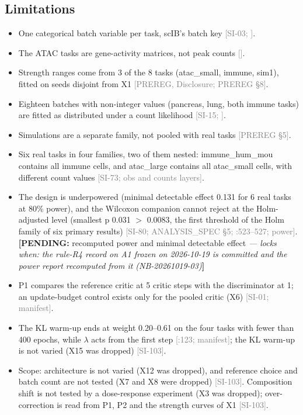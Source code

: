 \documentclass[11pt]{article}
\newcommand{\src}[1]{{\scriptsize\textcolor{gray}{[#1]}}}
\newcommand{\pending}[2]{{\color{BurntOrange}\textbf{[PENDING:} #1 \textit{--- locks when: #2}\textbf{]}}}
\begin{document}
\subsection{Limitations}
\begin{itemize}
\item One categorical batch variable per task, scIB's batch key \src{SI-03; }.
\item The ATAC tasks are gene-activity matrices, not peak counts \src{}.
\item Strength ranges come from 3 of the 8 tasks (atac\_small, immune, sim1), fitted on seeds disjoint from X1 \src{PREREG, Disclosure; PREREG \S8}.
\item Eighteen batches with non-integer values (pancreas, lung, both immune tasks) are fitted as distributed under a count likelihood \src{SI-15; }.
\item Simulations are a separate family, not pooled with real tasks \src{PREREG \S5}.
\item Six real tasks in four families, two of them nested: immune\_hum\_mou contains all immune cells, and atac\_large contains all atac\_small cells, with different count values \src{SI-73;  obs and counts layers}.
\item The design is underpowered (minimal detectable effect 0.131 for 6 real tasks at 80\% power), and the Wilcoxon companion cannot reject at the Holm-adjusted level (smallest p 0.031 $>$ 0.0083, the first threshold of the Holm family of six primary results) \src{SI-80; ANALYSIS\_SPEC \S5; :523--527; \file{docs/prereg/r1_record.json} power}. \pending{recomputed power and minimal detectable effect}{the rule-R4 record on A1 frozen on 2026-10-19 is committed and the power report recomputed from it (NB-20261019-03)}
\item P1 compares the reference critic at 5 critic steps with the discriminator at 1; an update-budget control exists only for the pooled critic (X6) \src{SI-01; manifest}.
\item The KL warm-up ends at weight 0.20--0.61 on the four tasks with fewer than 400 epochs, while $\lambda$ acts from the first step \src{:123; manifest}; the KL warm-up is not varied (X15 was dropped) \src{SI-103}.
\item Scope: architecture is not varied (X12 was dropped), and reference choice and batch count are not tested (X7 and X8 were dropped) \src{SI-103}. Composition shift is not tested by a dose-response experiment (X3 was dropped); over-correction is read from P1, P2 and the strength curves of X1 \src{SI-103}.

\end{itemize}
\end{document}

